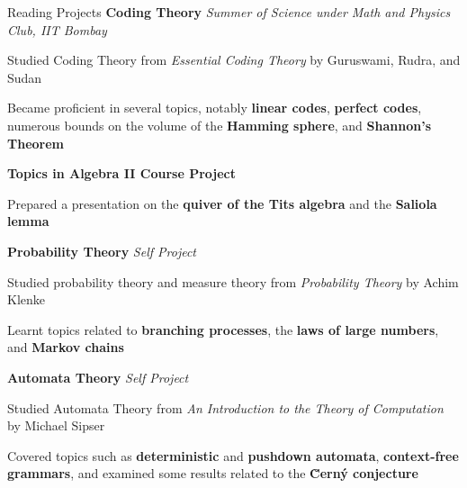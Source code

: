 \begin{rubric}{Reading Projects}
	\entry*[2020] \textbf{Coding Theory} \hfill \emph{Summer of Science under Math and Physics Club, IIT Bombay}

		Studied Coding Theory from \textit{Essential Coding Theory} by Guruswami, Rudra, and Sudan%
		
		Became proficient in several topics, notably \textbf{linear codes}, \textbf{perfect codes}, numerous bounds on the volume of the \textbf{Hamming sphere}, and \textbf{Shannon's Theorem}

	\entry*[2020\phantom{}] \textbf{Topics in Algebra II Course Project}

		Prepared a presentation on the \textbf{quiver of the Tits algebra} and the \textbf{Saliola lemma}

	\entry*[2020] \textbf{Probability Theory} \hfill \textit{Self Project}

		Studied probability theory and measure theory from \textit{Probability Theory} by Achim Klenke

		Learnt topics related to \textbf{branching processes}, the \textbf{laws of large numbers}, and \textbf{Markov chains}

	\entry*[2020\phantom{}] \textbf{Automata Theory} \hfill \textit{Self Project}

	Studied Automata Theory from \textit{An Introduction to the Theory of Computation} by Michael Sipser
        
        Covered topics such as \textbf{deterministic} and \textbf{pushdown automata}, \textbf{context-free grammars}, and examined some results related to the \textbf{\u{C}ern\'{y} conjecture}
\end{rubric}